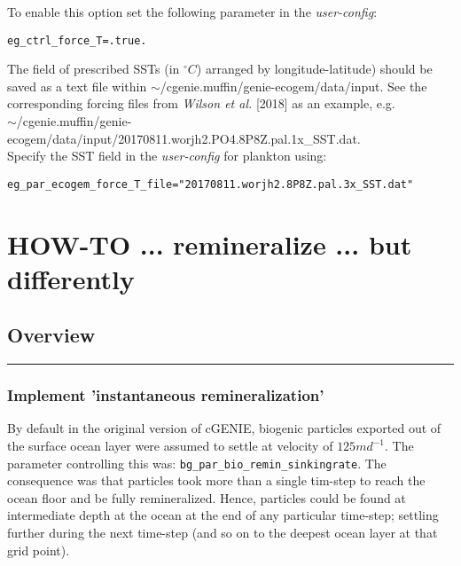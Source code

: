 \documentclass[11pt,fleqn]{book} %
\begin{document}
To enable this option set the following parameter in the \textit{user-config}:
\vspace{-1mm}\begin{verbatim}
eg_ctrl_force_T=.true.
\end{verbatim}\vspace{-1mm}
The field of prescribed SSTs (in \(^{\circ} C\)) arranged by longitude-latitude) should be saved as a text file within \textsf{\footnotesize \(\sim\)/cgenie.muffin/genie-ecogem/data/input}. See the corresponding forcing files from \textit{Wilson et al.} [2018] as an example, e.g.
\vspace{1mm}
\\\textsf{\footnotesize \(\sim\)/cgenie.muffin/genie-ecogem/data/input/20170811.worjh2.PO4.8P8Z.pal.1x\_SST.dat}.
\vspace{1mm}
\\Specify the SST field in the \textit{user-config} for plankton using:
\vspace{-2mm}\begin{verbatim}
eg_par_ecogem_force_T_file="20170811.worjh2.8P8Z.pal.3x_SST.dat"
\end{verbatim}\vspace{-1mm}


\newpage


\section{HOW-TO ... remineralize ... but differently}

%
\subsection*{Overview}
\vspace{1mm}

\hfill \break

\noindent\rule{4cm}{0.5pt}
\subsubsection{Implement 'instantaneous remineralization'}
\vspace{1mm}

By default in the original version of cGENIE, biogenic particles exported out of the surface ocean layer were assumed to settle at velocity of \(125md^{-1}\). The parameter controlling this was: \break\texttt{bg\_par\_bio\_remin\_sinkingrate}. The consequence was that particles took more than a single tim-step to reach the ocean floor and be fully remineralized. Hence, particles could be found at intermediate depth at the ocean at the end of any particular time-step; settling further during the next time-step (and so on to the deepest ocean layer at that grid point).
\end{document}
